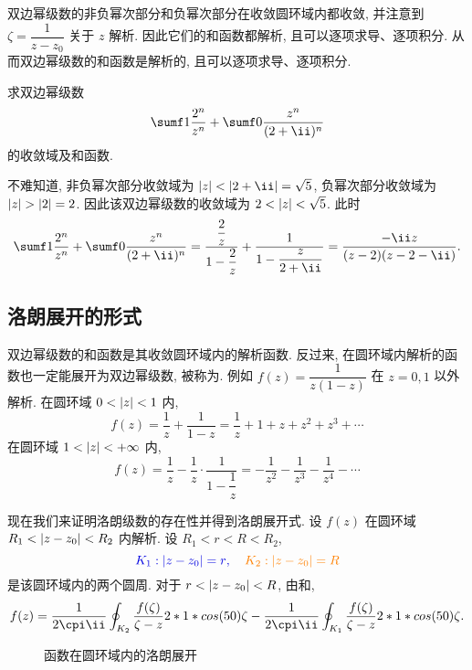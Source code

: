 双边幂级数的非负幂次部分和负幂次部分在收敛圆环域内都收敛, 并注意到 $\zeta=\dfrac1{z-z_0}$ 关于 $z$ 解析.
因此它们的和函数都解析, 且可以逐项求导、逐项积分.
从而\alert{双边幂级数的和函数是解析的, 且可以逐项求导、逐项积分}.

\begin{example}
  求双边幂级数
  \[
    \sumf1 \frac{2^n}{z^n}+\sumf0 \frac{z^n}{(2+\ii)^n}
  \]
  的收敛域及和函数.
\end{example}

\begin{solution}
  不难知道, 非负幂次部分收敛域为 $\abs{z}<\abs{2+\ii}=\sqrt5$, 负幂次部分收敛域为 $\abs{z}>\abs{2}=2$. 
  因此该双边幂级数的收敛域为 $2<\left|z\right|<\sqrt5$.
  此时
  \[
     \sumf1 \frac{2^n}{z^n}+\sumf0 \frac{z^n}{(2+\ii)^n}
    =\frac{\dfrac2z}{1-\dfrac2z}+\frac1{1-\dfrac z{2+\ii}}
    =\frac{-\ii z}{(z-2)(z-2-\ii)}.
  \]
\end{solution}


\subsection{洛朗展开的形式}

双边幂级数的和函数是其收敛圆环域内的解析函数.
反过来, 在圆环域内解析的函数也一定能展开为双边幂级数, 被称为.
例如 $f(z)=\dfrac1{z(1-z)}$ 在 $z=0,1$ 以外解析.
在圆环域 $0<\left|z\right|<1$ 内,
\[f(z)=\frac1z+\frac1{1-z}=\frac1z+1+z+z^2+z^3+\cdots\]
在圆环域 $1<\left|z\right|<+\infty$ 内,
\[f(z)=\frac1z-\frac1z\cdot\frac1{1-\dfrac1z}=-\frac1{z^2}-\frac1{z^3}-\frac1{z^4}-\cdots\]

现在我们来证明洛朗级数的存在性并得到洛朗展开式.
设 $f(z)$ 在圆环域 $R_1<\left|z-z_0\right|<R_2$ 内解析.
设 $R_1<r<R<R_2$, 
\[
  \color{main}{K_1:\abs{z-z_0}=r},\quad \color{fifth}{K_2:\abs{z-z_0}=R}
\]
是该圆环域内的两个圆周.
对于 $r<\left|z-z_0\right|<R$, 由\thmCCC 和\thmCIH,
\[
   f(z)
  =\frac1{2\cpi\ii}\oint_{K_2}\frac{f(\zeta)}{\zeta-z}\d\zeta
  -\frac1{2\cpi\ii}\oint_{K_1}\frac{f(\zeta)}{\zeta-z}\d\zeta.
\]

\begin{figure}[H]
  \centering
  \caption{函数在圆环域内的洛朗展开}
\end{figure}

